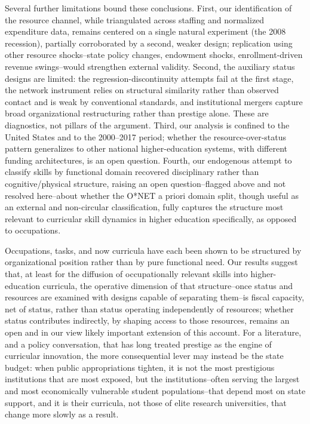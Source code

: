 \documentclass[11pt, letterpaper]{article}
\begin{document}
Several further limitations bound these conclusions. First, our identification of the resource channel, while triangulated across staffing and normalized expenditure data, remains centered on a single natural experiment (the 2008 recession), partially corroborated by a second, weaker design; replication using other resource shocks--state policy changes, endowment shocks, enrollment-driven revenue swings--would strengthen external validity. Second, the auxiliary status designs are limited: the regression-discontinuity attempts fail at the first stage, the network instrument relies on structural similarity rather than observed contact and is weak by conventional standards, and institutional mergers capture broad organizational restructuring rather than prestige alone. These are diagnostics, not pillars of the argument. Third, our analysis is confined to the United States and to the 2000--2017 period; whether the resource-over-status pattern generalizes to other national higher-education systems, with different funding architectures, is an open question. Fourth, our endogenous attempt to classify skills by functional domain recovered disciplinary rather than cognitive/physical structure, raising an open question--flagged above and not resolved here--about whether the O*NET a priori domain split, though useful as an external and non-circular classification, fully captures the structure most relevant to curricular skill dynamics in higher education specifically, as opposed to occupations.

Occupations, tasks, and now curricula have each been shown to be structured by organizational position rather than by pure functional need. Our results suggest that, at least for the diffusion of occupationally relevant skills into higher-education curricula, the operative dimension of that structure--once status and resources are examined with designs capable of separating them--is fiscal capacity, net of status, rather than status operating independently of resources; whether status contributes indirectly, by shaping access to those resources, remains an open and in our view likely important extension of this account. For a literature, and a policy conversation, that has long treated prestige as the engine of curricular innovation, the more consequential lever may instead be the state budget: when public appropriations tighten, it is not the most prestigious institutions that are most exposed, but the institutions--often serving the largest and most economically vulnerable student populations--that depend most on state support, and it is their curricula, not those of elite research universities, that change more slowly as a result.
\end{document}
